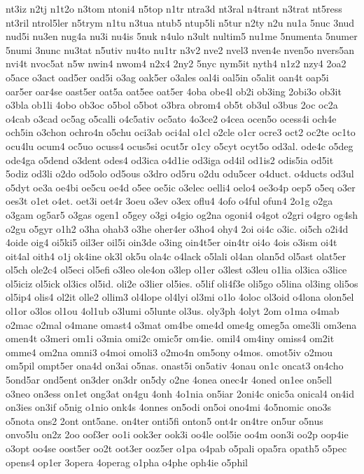 {nt3iz
n2tj
n1t2o
n3tom
ntoni4
n5top
n1tr
ntra3d
nt3ral
n4trant
n3trat
nt5ress
nt3ril
ntrol5ler
n5trym
n1tu
n3tua
ntub5
ntup5li
n5tur
n2ty
n2u
nu1a
5nuc
3nud
nud5i
nu3en
nug4a
nu3i
nu4is
5nuk
n4ulo
n3ult
nultim5
nu1me
5numenta
5numer
5numi
3nunc
nu3tat
n5utiv
nu4to
nu1tr
n3v2
nve2
nvel3
nven4e
nven5o
nvers5an
nvi4t
nvoc5at
n5w
nwin4
nwom4
n2x4
2ny2
5nyc
nym5it
nyth4
n1z2
nzy4
2oa2
o5ace
o3act
oad5er
oad5i
o3ag
oak5er
o3ales
oal4i
oal5in
o5alit
oan4t
oap5i
oar5er
oar4se
oast5er
oat5a
oat5ee
oat5er
4oba
obe4l
ob2i
ob3ing
2obi3o
ob3it
o3bla
ob1li
4obo
ob3oc
o5bol
o5bot
o3bra
obrom4
ob5t
ob3ul
o3bus
2oc
oc2a
o4cab
o3cad
oc5ag
o5calli
o4c5ativ
oc5ato
4o3ce2
o4cea
ocen5o
ocess4i
och4e
och5in
o3chon
ochro4n
o5chu
oci3ab
oci4al
o1cl
o2cle
o1cr
ocre3
oct2
oc2te
oc1to
ocu4lu
ocum4
oc5uo
ocuss4
ocus5si
ocut5r
o1cy
o5cyt
ocyt5o
od3al.
ode4c
o5deg
ode4ga
o5dend
o3dent
odes4
od3ica
o4d1ie
od3iga
od4il
od1is2
odis5ia
od5it
5odiz
od3li
o2do
od5olo
od5ous
o3dro
od5ru
o2du
odu5cer
o4duct.
o4ducts
od3ul
o5dyt
oe3a
oe4bi
oe5cu
oe4d
o5ee
oe5ic
o3elec
oelli4
oelo4
oe3o4p
oep5
o5eq
o3er
oes3t
o1et
o4et.
oet3i
oet4r
3oeu
o3ev
o3ex
oflu4
4ofo
o4ful
ofun4
2o1g
o2ga
o3gam
og5ar5
o3gas
ogen1
o5gey
o3gi
o4gio
og2na
ogoni4
o4got
o2gri
o4gro
og4sh
o2gu
o5gyr
o1h2
o3ha
ohab3
o3he
oher4er
o3ho4
ohy4
2oi
oi4c
o3ic.
oi5ch
o2i4d
4oide
oig4
oi5ki5
oil3er
oil5i
oin3de
o3ing
oin4t5er
oin4tr
oi4o
4ois
o3ism
oi4t
oit4al
oith4
o1j
ok4ine
ok3l
ok5u
ola4c
o4lack
o5lali
ol4an
olan5d
ol5ast
olat5er
ol5ch
ole2c4
ol5eci
ol5efi
o3leo
ole4on
o3lep
ol1er
o3lest
o3leu
o1lia
ol3ica
o3lice
ol5iciz
ol5ick
ol3ics
ol5id.
oli2e
o3lier
ol5ies.
o5lif
oli4f3e
oli5go
o5lina
ol3ing
oli5os
ol5ip4
olis4
ol2it
olle2
ollim3
ol4lope
ol4lyi
ol3mi
o1lo
4oloc
ol3oid
o4lona
olon5el
ol1or
o3los
ol1ou
4ol1ub
o3lumi
o5lunte
ol3us.
oly3ph
4olyt
2om
o1ma
o4mab
o2mac
o2mal
o4mane
omast4
o3mat
om4be
ome4d
ome4g
omeg5a
ome3li
om3ena
omen4t
o3meri
om1i
o3mia
omi2c
omic5r
om4ie.
omil4
om4iny
omiss4
om2it
omme4
om2na
omni3
o4moi
omoli3
o2mo4n
om5ony
o4mos.
omot5iv
o2mou
om5pil
ompt5er
ona4d
on3ai
o5nas.
onast5i
on5ativ
4onau
on1c
oncat3
on4cho
5ond5ar
ond5ent
on3der
on3dr
on5dy
o2ne
4onea
onec4r
4oned
on1ee
on5ell
o3neo
on3ess
on1et
ong3at
on4gu
4onh
4o1nia
on5iar
2oni4c
onic5a
onical4
on4id
on3ies
on3if
o5nig
o1nio
onk4s
4onnes
on5odi
on5oi
ono4mi
4o5nomic
ono3s
o5nota
ons2
2ont
ont5ane.
on4ter
onti5fi
onton5
ont4r
on4tre
on5ur
o5nus
onvo5lu
on2z
2oo
oof3er
oo1i
ook3er
ook3i
oo4le
ool5ie
oo4m
oon3i
oo2p
oop4ie
o3opt
oo4se
oost5er
oo2t
oot3er
ooz5er
o1pa
o4pab
o5pali
opa5ra
opath5
o5pec
opens4
op1er
3opera
4operag
o1pha
o4phe
oph4ie
o5phil
}
